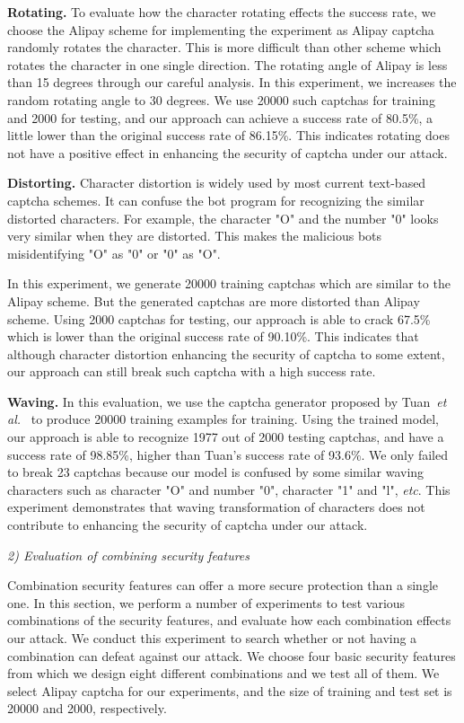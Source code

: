 \textbf{Rotating.} To evaluate how the character rotating effects the success rate, we choose the Alipay scheme for implementing the experiment as Alipay captcha randomly rotates the character. This is more difficult than other scheme which rotates the character in one single direction. The rotating angle of Alipay is less than 15 degrees through our careful analysis. In this experiment, we increases the random rotating angle to 30 degrees. We use 20000 such captchas for training and 2000 for testing, and our approach can achieve a success rate of 80.5\%, a little lower than the original success rate of 86.15\%. This indicates rotating does not have a positive effect in enhancing the security of captcha under our attack.

\textbf{Distorting.} Character distortion is widely used by most current text-based captcha schemes. It can confuse the bot program for recognizing the similar distorted characters. For example, the character "O" and the number "0" looks very similar when they are distorted. This makes the malicious bots misidentifying "O" as "0" or "0" as "O".

In this experiment, we generate 20000 training captchas which are similar to the Alipay scheme. But the generated captchas are more distorted than Alipay scheme. Using 2000 captchas for testing, our approach is able to crack 67.5\% which is lower than the original success rate of 90.10\%. This indicates that although character distortion enhancing the security of captcha to some extent, our approach can still break such captcha with a high success rate.

\textbf{Waving.} In this evaluation, we use the captcha generator proposed by Tuan~\emph{et al.}~\cite{Le2017Using} to produce 20000 training examples for training. Using the trained model, our approach is able to recognize 1977 out of 2000 testing captchas, and have a success rate of 98.85\%, higher than Tuan's success rate of 93.6\%. We only failed to break 23 captchas because our model is confused by some similar waving characters such as character "O" and number "0", character "1" and "l", \emph{etc}.  This experiment demonstrates that waving transformation of characters does not contribute to enhancing the security of captcha under our attack.


\noindent \emph{2) Evaluation of combining security features}

Combination security features can offer a more secure protection than a single one. In this section, we perform a number of experiments to test various combinations of the security features, and evaluate how each combination effects our attack. We conduct this experiment to search whether or not having a combination can defeat against our attack. We choose four basic security features from which we design eight different combinations and we test all of them. We select Alipay captcha for our experiments, and the size of training and test set is 20000 and 2000, respectively.

